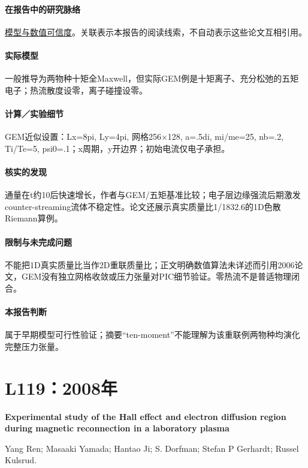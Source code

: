\documentclass[UTF8,a4paper,11pt,openany,fontset=fandol]{ctexbook}
\begin{document}
\paragraph{在报告中的研究脉络}\hyperref[V1-ch:numerics]{模型与数值可信度}。关联表示本报告的阅读线索，不自动表示这些论文互相引用。

\paragraph{实际模型}一般推导为两物种十矩全Maxwell，但实际GEM例是十矩离子、充分松弛的五矩电子；热流散度设零，离子碰撞设零。

\paragraph{计算／实验细节}GEM近似设置：Lx=8pi, Ly=4pi, 网格256×128, a=.5di, mi/me=25, nb=.2, Ti/Te=5, psi0=.1；x周期，y开边界；初始电流仅电子承担。

\paragraph{核实的发现}通量在t约10后快速增长，作者与GEM/五矩基准比较；电子层边缘强流后期激发counter-streaming流体不稳定性。论文还展示真实质量比1/1832.6的1D色散Riemann算例。

\paragraph{限制与未完成问题}不能把1D真实质量比当作2D重联质量比；正文明确数值算法未详述而引用2006论文，GEM没有独立网格收敛或压力张量对PIC细节验证。零热流不是普适物理闭合。

\paragraph{本报告判断}属于早期模型可行性验证；摘要“ten-moment”不能理解为该重联例两物种均演化完整压力张量。

\section{L119：2008年}\label{paper:L119}

\textbf{Experimental study of the Hall effect and electron diffusion region during magnetic reconnection in a laboratory plasma}\citep{L119}\

Yang Ren;  Masaaki Yamada;  Hantao Ji;  S. Dorfman;  Stefan P Gerhardt;  Russel Kulsrud.
\end{document}

